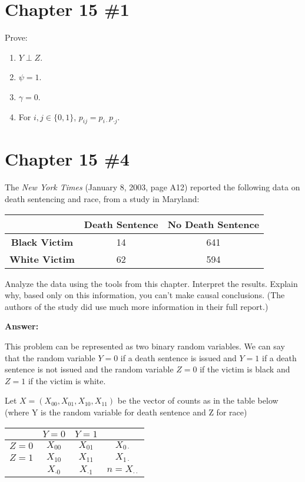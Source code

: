 \documentclass[12pt]{article}
\begin{document}
\section{Chapter 15 \#1}
Prove:
\begin{enumerate}
    \item \( Y \perp Z \).
    \item \( \psi = 1 \).
    \item \( \gamma = 0 \).
    \item For \( i, j \in \{0, 1\} \), \( p_{ij} = p_{i\cdot} p_{\cdot j} \).
\end{enumerate}



\pagebreak
\section{Chapter 15 \#4}
The \textit{New York Times} (January 8, 2003, page A12) reported the following data on death sentencing and race, from a study in Maryland:

\begin{center}
\begin{tabular}{|c|c|c|}
\hline
 & \textbf{Death Sentence} & \textbf{No Death Sentence} \\
\hline
\textbf{Black Victim} & 14 & 641 \\
\hline
\textbf{White Victim} & 62 & 594 \\
\hline
\end{tabular}
\end{center}

Analyze the data using the tools from this chapter. Interpret the results. Explain why, based only on this information, you can’t make causal conclusions. (The authors of the study did use much more information in their full report.)

\textbf{Answer:}

This problem can be represented as two binary random variables. We can say that the random variable $Y = 0$ if a death sentence is issued and $Y = 1$ if a death sentence is not issued and the random variable $Z = 0$ if the victim is black and $Z = 1$ if the victim is white.

Let $X = (X_{00}, X_{01}, X_{10}, X_{11})$ be the vector of counts as in the table below (where Y is the random variable for death sentence and Z for race)

\begin{center}
\begin{tabular}{|c|c|c|c|}
\hline
 & $Y = 0$ & $Y = 1$ & \\ 
\hline
$Z = 0$ & $X_{00}$ & $X_{01}$ & $X_{0\cdot}$ \\ 
\hline
$Z = 1$ & $X_{10}$ & $X_{11}$ & $X_{1\cdot}$ \\ 
\hline
 & $X_{\cdot 0}$ & $X_{\cdot 1}$ & $n = X_{\cdot\cdot}$ \\ 
\hline
\end{tabular}
\end{center}
\end{document}
